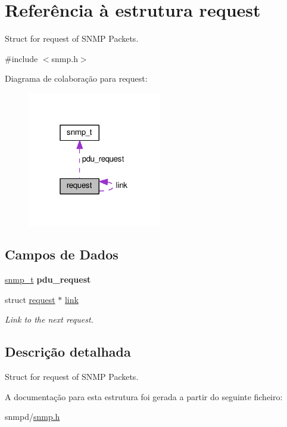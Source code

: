 \hypertarget{structrequest}{\section{Referência à estrutura request}
\label{structrequest}
}


Struct for request of S\+N\+M\+P Packets.  




{\ttfamily \#include $<$snmp.\+h$>$}



Diagrama de colaboração para request\+:\nopagebreak
\begin{figure}[H]
\begin{center}
\leavevmode
\includegraphics[width=166pt]{structrequest__coll__graph}
\end{center}
\end{figure}
\subsection*{Campos de Dados}
\begin{DoxyCompactItemize}
\item 
\hypertarget{structrequest_a445707e516f8c0aefe1ae30108d8e755}{\hyperlink{structsnmp__t}{snmp\+\_\+t} {\bfseries pdu\+\_\+request}}\label{structrequest_a445707e516f8c0aefe1ae30108d8e755}

\item 
\hypertarget{structrequest_acd3424c52c115fc00144c6679816c819}{struct \hyperlink{structrequest}{request} $\ast$ \hyperlink{structrequest_acd3424c52c115fc00144c6679816c819}{link}}\label{structrequest_acd3424c52c115fc00144c6679816c819}

\begin{DoxyCompactList}\small\item\em Link to the next request. \end{DoxyCompactList}\end{DoxyCompactItemize}


\subsection{Descrição detalhada}
Struct for request of S\+N\+M\+P Packets. 

A documentação para esta estrutura foi gerada a partir do seguinte ficheiro\+:\begin{DoxyCompactItemize}
\item 
snmpd/\hyperlink{snmp_8h}{snmp.\+h}\end{DoxyCompactItemize}

